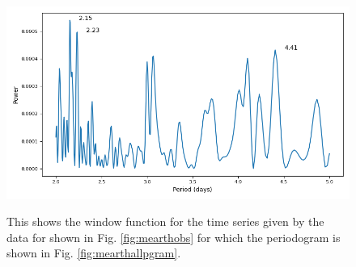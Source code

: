 \begin{figure}[!htbp]
\begin{center}
\includegraphics[scale=0.40]{mearth/images/mearthwinf.png} \\
\vspace{-.5cm}
\end{center}
\caption{This shows the window function for
the time series given by the {\MEarth} data
for {\ross} shown in Fig. \ref{fig:mearthobs}
for which the periodogram is shown in Fig.
\ref{fig:mearthallpgram}.}\protect\label{fig:mearthwinfunc}
\end{figure}

